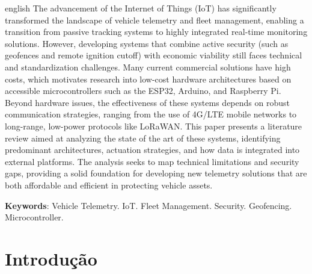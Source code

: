 \documentclass[
	article,			%
	11pt,				%
	oneside,			%
	a4paper,			%
	english,			%
	brazil,				%
	sumario=tradicional
	]{abntex2}
\begin{document}
\vspace{2cm}
\renewcommand{\resumoname}{Abstract}
\begin{resumoumacoluna}
   \begin{otherlanguage*}{english}
      The advancement of the Internet of Things (IoT) has significantly transformed the landscape of vehicle telemetry and fleet management, enabling a transition from passive tracking systems to highly integrated real-time monitoring solutions. However, developing systems that combine active security (such as geofences and remote ignition cutoff) with economic viability still faces technical and standardization challenges. Many current commercial solutions have high costs, which motivates research into low-cost hardware architectures based on accessible microcontrollers such as the ESP32, Arduino, and Raspberry Pi. Beyond hardware issues, the effectiveness of these systems depends on robust communication strategies, ranging from the use of 4G/LTE mobile networks to long-range, low-power protocols like LoRaWAN. This paper presents a literature review aimed at analyzing the state of the art of these systems, identifying predominant architectures, actuation strategies, and how data is integrated into external platforms. The analysis seeks to map technical limitations and security gaps, providing a solid foundation for developing new telemetry solutions that are both affordable and efficient in protecting vehicle assets.

      \vspace{\onelineskip}

      \noindent
      \textbf{Keywords}: Vehicle Telemetry. IoT. Fleet Management. Security. Geofencing. Microcontroller.
   \end{otherlanguage*}
\end{resumoumacoluna}


\textual

\section*{Introdução}
\end{document}
